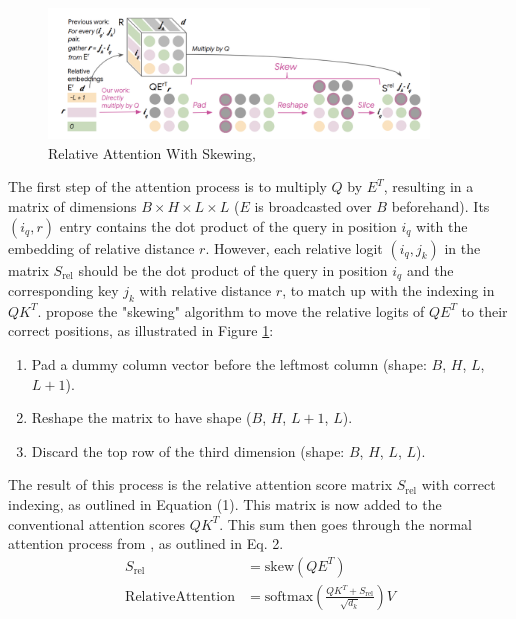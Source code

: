 \documentclass[a4paper,12pt]{extarticle}
\begin{document}
\begin{figure}[H] %
    \centering
    \includegraphics[width=0.9\textwidth]{relative_attn_skewing.png} %
    \caption{Relative Attention With Skewing, \textcite{DBLP:journals/corr/abs-1809-04281}}
    \label{fig:relatt}
\end{figure}
\vspace{0.1cm}
The first step of the attention process is to multiply $Q$ by $E^T$, resulting in a matrix of dimensions $B \times H \times L \times L$ ($E$ is broadcasted over $B$ beforehand). Its $(i_q, r)$ entry contains the dot product of the query in position $i_q$ with the embedding of relative distance $r$. However, each relative logit $(i_q, j_k)$ in the matrix $S_\text{rel}$  should be the dot product of the query in position $i_q$ and the corresponding key $j_k$ with relative distance $r$, to match up with the indexing in $QK^T$.
\textcite{DBLP:journals/corr/abs-1809-04281} propose the "skewing" algorithm to move the relative logits of $QE^T$ to their correct positions, as illustrated in Figure \ref{fig:relatt}:

\begin{enumerate}
\item Pad a dummy column vector before the leftmost column (shape: $B$, $H$, $L$, $L + 1$).
\item Reshape the matrix to have shape ($B$, $H$, $L + 1$, $L$).
\item Discard the top row of the third dimension (shape: $B$, $H$, $L$, $L$).
\end{enumerate}

The result of this process is the relative attention score matrix $S_\text{rel}$ with correct indexing, as outlined in Equation (1). This matrix is now added to the conventional attention scores $QK^T$. This sum then goes through the normal attention process from \textcite{DBLP:journals/corr/VaswaniSPUJGKP17}, as outlined in Eq. 2.\vspace{0.15cm}
\begin{align}
S_{\text{rel}} &= \text{skew}(QE^T) \\[0.2cm] 
\text{RelativeAttention} &=
\text{softmax}\left(\frac{QK^T+S_\text{rel}}{\sqrt{d_k}}\right)V
\end{align}
\end{document}
